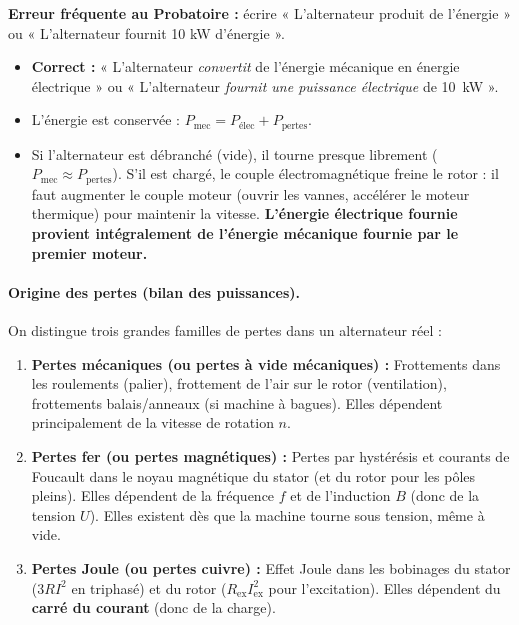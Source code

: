 \documentclass[11pt]{article}
\begin{document}
\begin{attention}
\textbf{Erreur fréquente au Probatoire :} écrire « L'alternateur produit de l'énergie » ou « L'alternateur fournit 10 kW d'énergie ».
\begin{itemize}
    \item \textbf{Correct :} « L'alternateur \emph{convertit} de l'énergie mécanique en énergie électrique » ou « L'alternateur \emph{fournit une puissance électrique} de \SI{10}{kW} ».
    \item L'énergie est conservée : $P_{\text{mec}} = P_{\text{élec}} + P_{\text{pertes}}$.
    \item Si l'alternateur est débranché (vide), il tourne presque librement ($P_{\text{mec}} \approx P_{\text{pertes}}$). S'il est chargé, le couple électromagnétique freine le rotor : il faut augmenter le couple moteur (ouvrir les vannes, accélérer le moteur thermique) pour maintenir la vitesse. \textbf{L'énergie électrique fournie provient intégralement de l'énergie mécanique fournie par le premier moteur.}
\end{itemize}
\end{attention}

\paragraph{Origine des pertes (bilan des puissances).}
On distingue trois grandes familles de pertes dans un alternateur réel :
\begin{enumerate}
    \item \textbf{Pertes mécaniques (ou pertes à vide mécaniques) :} Frottements dans les roulements (palier), frottement de l'air sur le rotor (ventilation), frottements balais/anneaux (si machine à bagues). Elles dépendent principalement de la vitesse de rotation $n$.
    \item \textbf{Pertes fer (ou pertes magnétiques) :} Pertes par hystérésis et courants de Foucault dans le noyau magnétique du stator (et du rotor pour les pôles pleins). Elles dépendent de la fréquence $f$ et de l'induction $B$ (donc de la tension $U$). Elles existent dès que la machine tourne sous tension, même à vide.
    \item \textbf{Pertes Joule (ou pertes cuivre) :} Effet Joule dans les bobinages du stator ($3 R I^2$ en triphasé) et du rotor ($R_{\text{ex}} I_{\text{ex}}^2$ pour l'excitation). Elles dépendent du \textbf{carré du courant} (donc de la charge).
\end{enumerate}
\end{document}
